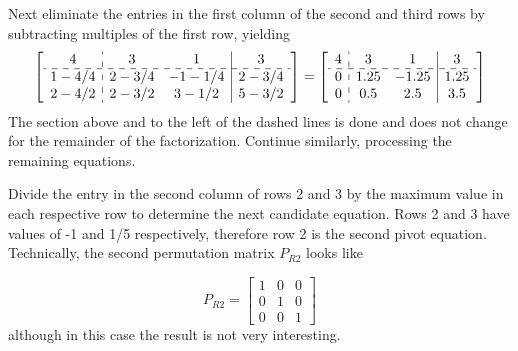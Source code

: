 \documentclass[12pt]{article}   %
\newcounter{case}
\begin{document}
Next eliminate the entries in the first column of the second and third rows by subtracting multiples of the first row, yielding
\begin{equation}
\left[
\begin{array}{c:cc|c}
4 & 3 & 1 & 3 \\
\hdashline
1-4/4 & 2-3/4 & -1-1/4 & 2-3/4 \\
2-4/2 & 2-3/2 & 3-1/2 & 5-3/2 
\end{array}
\right]=
\left[
\begin{array}{c:cc|c}
4 & 3 & 1 & 3 \\
\hdashline
0 & 1.25 & -1.25 & 1.25 \\
0 & 0.5 & 2.5 & 3.5
\end{array}
\right]
\label{eq:U1}
\end{equation}
The section above and to the left of the dashed lines is done and does not change for the remainder of the factorization. Continue similarly, processing the remaining equations.

Divide the entry in the second column of rows 2 and 3 by the maximum value in each respective row to determine the next candidate equation. Rows 2 and 3 have values of -1 and 1/5 respectively, therefore row 2 is the second pivot equation. Technically, the second permutation matrix $P_{R2}$ looks like

\begin{equation}
P_{R2}=\begin{bmatrix}
1 & 0 & 0\\
0 & 1 & 0\\
0 & 0 & 1
\end{bmatrix}
\end{equation}
although in this case the result is not very interesting.
\end{document}
